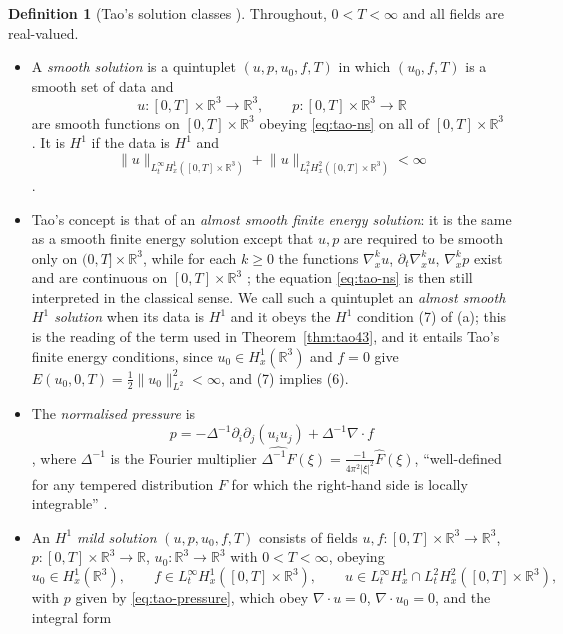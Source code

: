\documentclass[11pt]{article}
\theoremstyle{definition}
\newtheorem{definition}[theorem]{Definition}
\theoremstyle{plain}
\newcommand{\R}{\mathbb R}
\newcommand{\norm}[1]{\lVert #1\rVert}
\begin{document}
\begin{definition}[Tao's solution classes {\cite[pp.~26--31]{Tao2013}}]
\label{def:tao-mild}
Throughout, $0<T<\infty$ and all fields are real-valued.
\begin{itemize}
\item[(a)] A \emph{smooth solution} is a quintuplet $(u,p,u_0,f,T)$ in
which $(u_0,f,T)$ is a smooth set of data and
\[
 u:[0,T]\times\R^3\to\R^3,\qquad p:[0,T]\times\R^3\to\R
\]
are smooth functions on $[0,T]\times\R^3$ obeying \eqref{eq:tao-ns} on all
of $[0,T]\times\R^3$ \cite[p.~26]{Tao2013}.  It is \emph{$H^1$} if the
data is $H^1$ and
\[
 \norm u_{L^\infty_tH^1_x([0,T]\times\R^3)}
 +\norm u_{L^2_tH^2_x([0,T]\times\R^3)}<\infty
\]
\cite[(7), p.~27]{Tao2013}.
\item[(b)] Tao's concept is that of an \emph{almost smooth finite energy
solution}: it is the same as a smooth finite energy solution except that
$u,p$ are required to be smooth only on $(0,T]\times\R^3$, while for each
$k\geq0$ the functions $\nabla_x^ku$, $\partial_t\nabla_x^ku$,
$\nabla_x^kp$ exist and are continuous on $[0,T]\times\R^3$
\cite[p.~31]{Tao2013}; the equation \eqref{eq:tao-ns} is then still
interpreted in the classical sense.  We call such a quintuplet an
\emph{almost smooth $H^1$ solution} when its data is $H^1$ and it obeys the
$H^1$ condition (7) of (a); this is the reading of the term used in
Theorem~\ref{thm:tao43}, and it entails Tao's finite energy conditions,
since $u_0\in H^1_x(\R^3)$ and $f=0$ give
$E(u_0,0,T)=\frac12\norm{u_0}_{L^2}^2<\infty$, and (7) implies (6).
\item[(c)] The \emph{normalised pressure} is
\begin{equation}\label{eq:tao-pressure}
 p=-\Delta^{-1}\partial_i\partial_j(u_iu_j)+\Delta^{-1}\nabla\cdot f
\end{equation}
\cite[(9), p.~28]{Tao2013}, where $\Delta^{-1}$ is the Fourier multiplier
$\widehat{\Delta^{-1}F}(\xi)=\frac{-1}{4\pi^2|\xi|^2}\widehat F(\xi)$,
``well-defined for any tempered distribution $F$ for which the right-hand
side is locally integrable'' \cite[(14), p.~38]{Tao2013}.
\item[(d)] An \emph{$H^1$ mild solution} $(u,p,u_0,f,T)$ consists of fields
$u,f:[0,T]\times\R^3\to\R^3$, $p:[0,T]\times\R^3\to\R$,
$u_0:\R^3\to\R^3$ with $0<T<\infty$, obeying
\[
 u_0\in H^1_x(\R^3),\qquad f\in L^\infty_tH^1_x([0,T]\times\R^3),\qquad
 u\in L^\infty_tH^1_x\cap L^2_tH^2_x([0,T]\times\R^3),
\]
with $p$ given by \eqref{eq:tao-pressure}, which obey $\nabla\cdot u=0$,
$\nabla\cdot u_0=0$, and the integral form

\end{itemize}
\end{definition}
\end{document}
